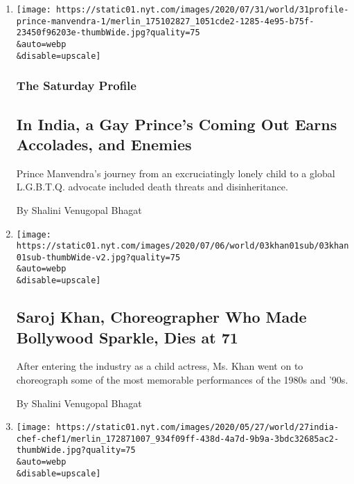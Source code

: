\begin{enumerate}
\def\labelenumi{\arabic{enumi}.}
\item
  \href{/2020/07/31/world/asia/india-prince-manvendra-gay-rights.html}{}

  \texttt{[image: https://static01.nyt.com/images/2020/07/31/world/31profile-prince-manvendra-1/merlin\_175102827\_1051cde2-1285-4e95-b75f-23450f96203e-thumbWide.jpg?quality=75\\\&auto=webp\\\&disable=upscale]}

  \hypertarget{the-saturday-profile}{%
  \subsubsection{The Saturday Profile}\label{the-saturday-profile}}

  \hypertarget{in-india-a-gay-princes-coming-out-earns-accolades-and-enemies}{%
  \subsection{In India, a Gay Prince's Coming Out Earns Accolades, and
  Enemies}\label{in-india-a-gay-princes-coming-out-earns-accolades-and-enemies}}

  Prince Manvendra's journey from an excruciatingly lonely child to a
  global L.G.B.T.Q. advocate included death threats and disinheritance.

  By Shalini Venugopal Bhagat
\item
  \href{/2020/07/03/world/asia/saroj-khan-dead.html}{}

  \texttt{[image: https://static01.nyt.com/images/2020/07/06/world/03khan01sub/03khan01sub-thumbWide-v2.jpg?quality=75\\\&auto=webp\\\&disable=upscale]}

  \hypertarget{saroj-khan-choreographer-who-made-bollywood-sparkle-dies-at-71}{%
  \subsection{Saroj Khan, Choreographer Who Made Bollywood Sparkle, Dies
  at
  71}\label{saroj-khan-choreographer-who-made-bollywood-sparkle-dies-at-71}}

  After entering the industry as a child actress, Ms. Khan went on to
  choreograph some of the most memorable performances of the 1980s and
  '90s.

  By Shalini Venugopal Bhagat
\item
  \href{/2020/05/27/world/asia/vikas-khanna-india-hungry.html}{}

  \texttt{[image: https://static01.nyt.com/images/2020/05/27/world/27india-chef-chef1/merlin\_172871007\_934f09ff-438d-4a7d-9b9a-3bdc32685ac2-thumbWide.jpg?quality=75\\\&auto=webp\\\&disable=upscale]}


\end{enumerate}
